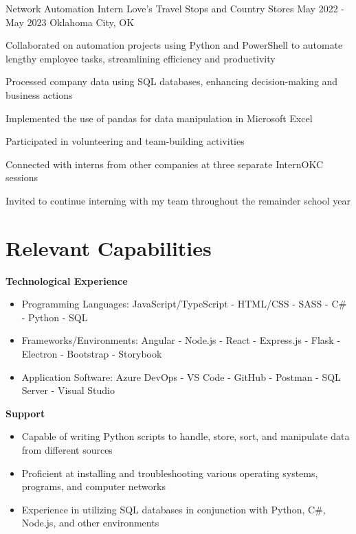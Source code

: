 \documentclass[letterpaper]{resumeconfig}
\begin{document}
\WorkExperience
    {Network Automation Intern} %
    {Love's Travel Stops and Country Stores} %
    {May 2022 - May 2023} %
    {Oklahoma City, OK} %
    {
        \item Collaborated on automation projects using Python and PowerShell to automate lengthy employee tasks, streamlining efficiency and productivity
        \item Processed company data using SQL databases, enhancing decision-making and business actions
        \item Implemented the use of pandas for data manipulation in Microsoft Excel
        \item Participated in volunteering and team-building activities
        \item Connected with interns from other companies at three separate InternOKC sessions
        \item Invited to continue interning with my team throughout the remainder school year
    }
    

\section{Relevant Capabilities}

\textbf{Technological Experience}
\begin{itemize}
    \item Programming Languages: JavaScript/TypeScript - HTML/CSS - SASS - C\# - Python - SQL
    \item Frameworks/Environments: Angular - Node.js - React - Express.js - Flask - Electron - Bootstrap - Storybook
    \item Application Software: Azure DevOps - VS Code - GitHub - Postman - SQL Server - Visual Studio
\end{itemize}

\textbf{Support}
\begin{itemize}
    \item Capable of writing Python scripts to handle, store, sort, and manipulate data from different sources
    \item Proficient at installing and troubleshooting various operating systems, programs, and computer networks
    \item Experience in utilizing SQL databases in conjunction with Python, C\#, Node.js, and other environments
\end{itemize}
\end{document}
